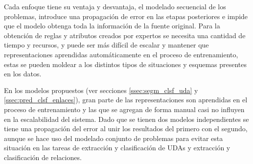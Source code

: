 \documentclass[a4paper,11pt,twocolumn,twoside]{article}
\begin{document}
Cada enfoque tiene su ventaja y desvantaja, el modelado secuencial de los problemas, introduce
una propagación de error en las etapas posteriores e impide que el modelo obtenga toda la información de
la fuente original. Para la obtención de reglas y atributos creados por expertos 
se necesita una cantidad 
de tiempo y recursos, y puede ser más difícil de escalar y mantener que representaciones aprendidas
automáticamente en el proceso de entrenamiento, estas se pueden moldear a los distintos
tipos de situaciones y esquemas presentes en los datos.

En los modelos propuestos (ver secciones \ref{ssec:segm_clsf_uda} y \ref{ssec:pred_clsf_enlaces}), gran parte de las representaciones son aprendidas en el proceso de 
entrenamiento y las que se agregan de forma manual casi no influyen en la escalabilidad del sistema.
Dado que se tienen dos modelos independientes se tiene una propagación del error al unir los resultados 
del primero con el segundo, aunque se hace uso del modelado conjunto de problemas para evitar esta 
situación en las tareas de extracción y clasificación de UDAs y extracción y clasificación de relaciones.

\end{document}

